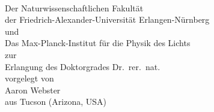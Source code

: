 \begin{titlepage}
\begin{center}
\hfill\\[2cm]
{\Huge {\bfseries \textsc {\distitle}} \par}
\vspace{11.0cm}
{\large
Der Naturwissenschaftlichen Fakultät\\
der Friedrich-Alexander-Universität Erlangen-Nürnberg\\
und\\
Das Max-Planck-Institut für die Physik des Lichts\\
\vspace{0.5cm}
zur\\
Erlangung des Doktorgrades Dr.\ rer.\ nat.\ \\
\vspace{0.5cm}
vorgelegt von\\
Aaron Webster\\
aus Tucson (Arizona, USA)
}
\end{center}
\tikzexternaldisable{}
\tikzexternalenable{}
\end{titlepage}
